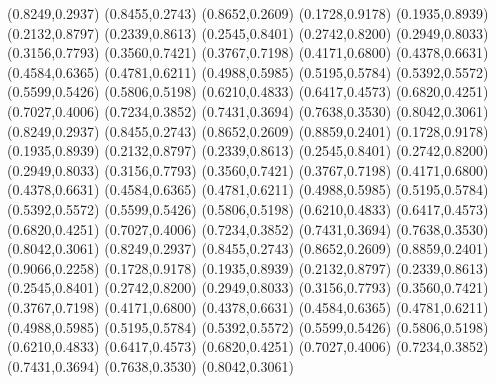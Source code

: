 \PST@Diamond(0.8249,0.2937)
\PST@Diamond(0.8455,0.2743)
\PST@Diamond(0.8652,0.2609)
\PST@Diamond(0.1728,0.9178)
\PST@Diamond(0.1935,0.8939)
\PST@Diamond(0.2132,0.8797)
\PST@Diamond(0.2339,0.8613)
\PST@Diamond(0.2545,0.8401)
\PST@Diamond(0.2742,0.8200)
\PST@Diamond(0.2949,0.8033)
\PST@Diamond(0.3156,0.7793)
\PST@Diamond(0.3560,0.7421)
\PST@Diamond(0.3767,0.7198)
\PST@Diamond(0.4171,0.6800)
\PST@Diamond(0.4378,0.6631)
\PST@Diamond(0.4584,0.6365)
\PST@Diamond(0.4781,0.6211)
\PST@Diamond(0.4988,0.5985)
\PST@Diamond(0.5195,0.5784)
\PST@Diamond(0.5392,0.5572)
\PST@Diamond(0.5599,0.5426)
\PST@Diamond(0.5806,0.5198)
\PST@Diamond(0.6210,0.4833)
\PST@Diamond(0.6417,0.4573)
\PST@Diamond(0.6820,0.4251)
\PST@Diamond(0.7027,0.4006)
\PST@Diamond(0.7234,0.3852)
\PST@Diamond(0.7431,0.3694)
\PST@Diamond(0.7638,0.3530)
\PST@Diamond(0.8042,0.3061)
\PST@Diamond(0.8249,0.2937)
\PST@Diamond(0.8455,0.2743)
\PST@Diamond(0.8652,0.2609)
\PST@Diamond(0.8859,0.2401)
\PST@Diamond(0.1728,0.9178)
\PST@Diamond(0.1935,0.8939)
\PST@Diamond(0.2132,0.8797)
\PST@Diamond(0.2339,0.8613)
\PST@Diamond(0.2545,0.8401)
\PST@Diamond(0.2742,0.8200)
\PST@Diamond(0.2949,0.8033)
\PST@Diamond(0.3156,0.7793)
\PST@Diamond(0.3560,0.7421)
\PST@Diamond(0.3767,0.7198)
\PST@Diamond(0.4171,0.6800)
\PST@Diamond(0.4378,0.6631)
\PST@Diamond(0.4584,0.6365)
\PST@Diamond(0.4781,0.6211)
\PST@Diamond(0.4988,0.5985)
\PST@Diamond(0.5195,0.5784)
\PST@Diamond(0.5392,0.5572)
\PST@Diamond(0.5599,0.5426)
\PST@Diamond(0.5806,0.5198)
\PST@Diamond(0.6210,0.4833)
\PST@Diamond(0.6417,0.4573)
\PST@Diamond(0.6820,0.4251)
\PST@Diamond(0.7027,0.4006)
\PST@Diamond(0.7234,0.3852)
\PST@Diamond(0.7431,0.3694)
\PST@Diamond(0.7638,0.3530)
\PST@Diamond(0.8042,0.3061)
\PST@Diamond(0.8249,0.2937)
\PST@Diamond(0.8455,0.2743)
\PST@Diamond(0.8652,0.2609)
\PST@Diamond(0.8859,0.2401)
\PST@Diamond(0.9066,0.2258)
\PST@Diamond(0.1728,0.9178)
\PST@Diamond(0.1935,0.8939)
\PST@Diamond(0.2132,0.8797)
\PST@Diamond(0.2339,0.8613)
\PST@Diamond(0.2545,0.8401)
\PST@Diamond(0.2742,0.8200)
\PST@Diamond(0.2949,0.8033)
\PST@Diamond(0.3156,0.7793)
\PST@Diamond(0.3560,0.7421)
\PST@Diamond(0.3767,0.7198)
\PST@Diamond(0.4171,0.6800)
\PST@Diamond(0.4378,0.6631)
\PST@Diamond(0.4584,0.6365)
\PST@Diamond(0.4781,0.6211)
\PST@Diamond(0.4988,0.5985)
\PST@Diamond(0.5195,0.5784)
\PST@Diamond(0.5392,0.5572)
\PST@Diamond(0.5599,0.5426)
\PST@Diamond(0.5806,0.5198)
\PST@Diamond(0.6210,0.4833)
\PST@Diamond(0.6417,0.4573)
\PST@Diamond(0.6820,0.4251)
\PST@Diamond(0.7027,0.4006)
\PST@Diamond(0.7234,0.3852)
\PST@Diamond(0.7431,0.3694)
\PST@Diamond(0.7638,0.3530)
\PST@Diamond(0.8042,0.3061)
